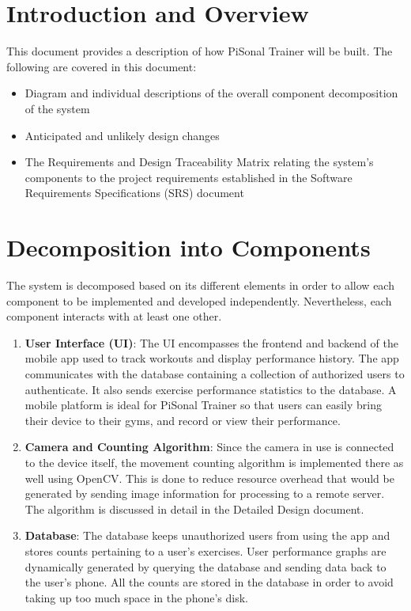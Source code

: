 \documentclass{article}
\begin{document}
\newpage

\clearpage
\setcounter{page}{1}

% 

\section{Introduction and Overview}
This document provides a description of how PiSonal Trainer will be built. The following are covered in this document:
\begin{itemize}
    \item Diagram and individual descriptions of the overall component decomposition of the system
    \item Anticipated and unlikely design changes
    \item The Requirements and Design Traceability Matrix relating the system’s components to the project requirements established in the Software Requirements Specifications (SRS) document
\end{itemize}

\section{Decomposition into Components}
The system is decomposed based on its different elements in order to allow each component to be implemented and developed independently. Nevertheless, each component interacts with at least one other.
\begin{enumerate}
\item \textbf{User Interface (UI)}: The UI encompasses the frontend and backend of the mobile app used to track workouts and display performance history. The app communicates with the database containing a collection of authorized users to authenticate. It also sends exercise performance statistics to the database. A mobile platform is ideal for PiSonal Trainer so that users can easily bring their device to their gyms, and record or view their performance.

\item \textbf{Camera and Counting Algorithm}: Since the camera in use is connected to the device itself, the movement counting algorithm is implemented there as well using OpenCV. This is done to reduce resource overhead that would be generated by sending image information for processing to a remote server. The algorithm is discussed in detail in the Detailed Design document.

\item \textbf{Database}: The database keeps unauthorized users from using the app and stores counts pertaining to a user's exercises. User performance graphs are dynamically generated by querying the database and sending data back to the user's phone. All the counts are stored in the database in order to avoid taking up too much space in the phone's disk.
\end{enumerate}
\end{document}
